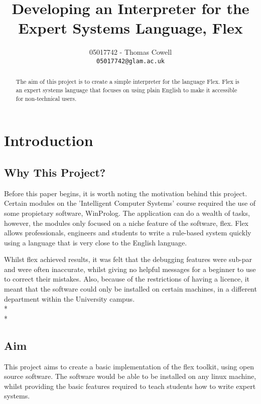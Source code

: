 \documentclass[12pt]{report}
\begin{document}
\title{Developing an Interpreter for the Expert Systems Language, Flex}
\author{05017742 - Thomas Cowell\\
		\texttt{05017742@glam.ac.uk}}

\maketitle

\begin{abstract}
The aim of this project is to create a simple interpreter for the language Flex.  Flex is an expert systems language that focuses on using plain English to make it accessible for
non-technical users.
\end{abstract}

\pagestyle{plain}

\tableofcontents

\cleardoublepage
{}

\chapter{Introduction}

\section[Why This Project?]{Why This Project?}\label{sec:why_this_project}
Before this paper begins, it is worth noting the motivation behind this project.  Certain modules on the 'Intelligent Computer Systems' course required the use of some propietary software, WinProlog.  The application can do a wealth of tasks, however, the modules only focused on a niche feature of the software, flex.  Flex allows professionals, engineers and students to write a rule-based system quickly using a language that is very close to the English language.

Whilst flex achieved results, it was felt that the debugging features were sub-par and were often inaccurate, whilst giving no helpful messages for a beginner to use to correct their mistakes.  Also, because of the restrictions of having a licence, it meant that the software could only be installed on certain machines, in a different department within the University campus.
\\*
\\*
\section{Aim}\label{sec:aim}
This project aims to create a basic implementation of the flex toolkit, using open source software.  The software would be able to be installed on any linux machine, whilst providing the basic features required to teach students how to write expert systems.
\end{document}
